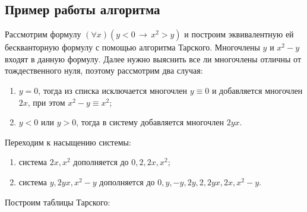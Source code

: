 \subsection{Пример работы алгоритма}
Рассмотрим формулу $(\forall x)(y < 0 \, \to \, x^2 > y)$ и построим эквивалентную ей бескванторную формулу с помощью алгоритма Тарского. Многочлены $y$ и $x^2 - y$ входят в данную формулу. Далее нужно выяснить все ли многочлены отличны от тождественного нуля, поэтому рассмотрим два случая:
\begin{enumerate}
    \item $y = 0$, тогда из списка исключается многочлен $y \equiv 0$ и добавляется многочлен $2x$, при этом $x^2 - y \equiv x^2$;
    \item $y < 0$ или $y > 0$, тогда в систему добавляется многочлен $2yx$.
\end{enumerate}
Переходим к насыщению системы:
\begin{enumerate}
    \item система $2x, x^2$ дополняется до $0, 2, 2x, x^2$;
    \item система $y, 2yx, x^2 - y$ дополняется до $0, y, -y, 2y, 2, 2yx, 2x, x^2 - y$.
\end{enumerate}
Построим таблицы Тарского:
